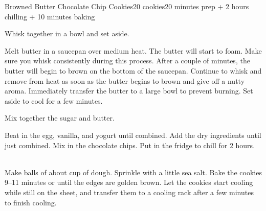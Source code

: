 \documentclass[../Cookbook.tex]{subfiles}
\begin{document}
\begin{recipe}{Browned Butter Chocolate Chip Cookies}{20 cookies}{20 minutes prep + 2 hours chilling + 10 minutes baking}

Whisk together in a bowl and set aside.

Melt butter in a saucepan over medium heat. The butter will start to foam. Make sure you whisk consistently during this process. After a couple of minutes, the butter will begin to brown on the bottom of the saucepan. Continue to whisk and remove from heat as soon as the butter begins to brown and give off a nutty aroma. Immediately transfer the butter to a large bowl to prevent burning. Set aside to cool for a few minutes.

Mix together the sugar and butter.

Beat in the egg, vanilla, and yogurt until combined. Add the dry ingredients until just combined. Mix in the chocolate chips. Put in the fridge to chill for 2 hours.

\\
Make balls of about  cup of dough. Sprinkle with a little sea salt.
Bake the cookies 9--11 minutes or until the edges are golden brown. Let the cookies start cooling while still on the sheet, and transfer them to a cooling rack after a few minutes to finish cooling.


\end{recipe}
\end{document}
